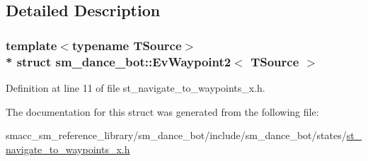 \subsection{Detailed Description}
\subsubsection*{template$<$typename T\+Source$>$\\*
struct sm\+\_\+dance\+\_\+bot\+::\+Ev\+Waypoint2$<$ T\+Source $>$}



Definition at line 11 of file st\+\_\+navigate\+\_\+to\+\_\+waypoints\+\_\+x.\+h.



The documentation for this struct was generated from the following file\+:\begin{DoxyCompactItemize}
\item 
smacc\+\_\+sm\+\_\+reference\+\_\+library/sm\+\_\+dance\+\_\+bot/include/sm\+\_\+dance\+\_\+bot/states/\hyperlink{st__navigate__to__waypoints__x_8h}{st\+\_\+navigate\+\_\+to\+\_\+waypoints\+\_\+x.\+h}\end{DoxyCompactItemize}
